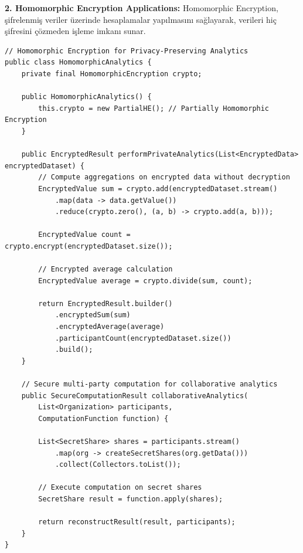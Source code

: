 \textbf{2. Homomorphic Encryption Applications:}
Homomorphic Encryption, şifrelenmiş veriler üzerinde hesaplamalar yapılmasını sağlayarak, verileri hiç şifresini çözmeden işleme imkanı sunar.

\begin{lstlisting}[breaklines=true,basicstyle=\ttfamily\footnotesize]
// Homomorphic Encryption for Privacy-Preserving Analytics
public class HomomorphicAnalytics {
    private final HomomorphicEncryption crypto;
    
    public HomomorphicAnalytics() {
        this.crypto = new PartialHE(); // Partially Homomorphic Encryption
    }
    
    public EncryptedResult performPrivateAnalytics(List<EncryptedData> encryptedDataset) {
        // Compute aggregations on encrypted data without decryption
        EncryptedValue sum = crypto.add(encryptedDataset.stream()
            .map(data -> data.getValue())
            .reduce(crypto.zero(), (a, b) -> crypto.add(a, b)));
        
        EncryptedValue count = crypto.encrypt(encryptedDataset.size());
        
        // Encrypted average calculation
        EncryptedValue average = crypto.divide(sum, count);
        
        return EncryptedResult.builder()
            .encryptedSum(sum)
            .encryptedAverage(average)
            .participantCount(encryptedDataset.size())
            .build();
    }
    
    // Secure multi-party computation for collaborative analytics
    public SecureComputationResult collaborativeAnalytics(
        List<Organization> participants,
        ComputationFunction function) {
        
        List<SecretShare> shares = participants.stream()
            .map(org -> createSecretShares(org.getData()))
            .collect(Collectors.toList());
        
        // Execute computation on secret shares
        SecretShare result = function.apply(shares);
        
        return reconstructResult(result, participants);
    }
}
\end{lstlisting}

